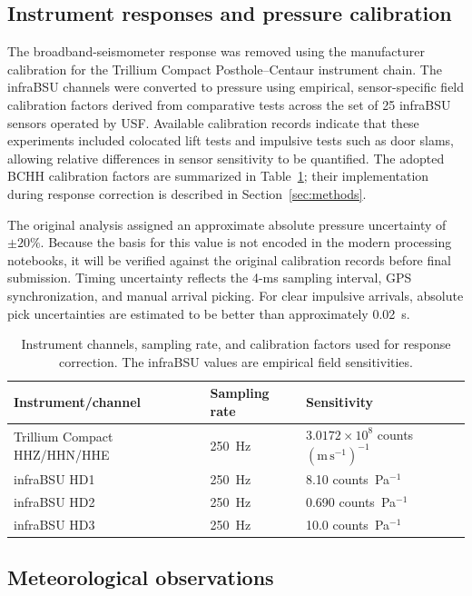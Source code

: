 \documentclass[]{seismica}
\begin{document}
\subsection{Instrument responses and pressure calibration}

The broadband-seismometer response was removed using the manufacturer
calibration for the Trillium Compact Posthole--Centaur instrument chain. The
infraBSU channels were converted to pressure using empirical, sensor-specific
field calibration factors derived from comparative tests across the set of 25
infraBSU sensors operated by USF. Available calibration records indicate that
these experiments included colocated lift tests and impulsive tests such as
door slams, allowing relative differences in sensor sensitivity to be
quantified. The adopted BCHH calibration factors are summarized in
Table~\ref{tab:instrument_calibration}; their implementation during response
correction is described in Section~\ref{sec:methods}.

The original analysis assigned an approximate absolute pressure uncertainty of
$\pm20\%$. Because the basis for this value is not encoded in the modern
processing notebooks, it will be verified against the original calibration
records before final submission. Timing uncertainty reflects the 4-ms sampling
interval, GPS synchronization, and manual arrival picking. For clear impulsive
arrivals, absolute pick uncertainties are estimated to be better than
approximately 0.02~s.

\begin{table}
\centering
\caption{Instrument channels, sampling rate, and calibration factors used for
response correction. The infraBSU values are empirical field sensitivities.}
\label{tab:instrument_calibration}
\begin{tabular}{lll}
\hline
Instrument/channel & Sampling rate & Sensitivity \\
\hline
Trillium Compact HHZ/HHN/HHE
  & 250~Hz
  & $3.0172\times10^8$ counts $(\mathrm{m\,s^{-1}})^{-1}$ \\
infraBSU HD1
  & 250~Hz
  & 8.10 counts~Pa$^{-1}$ \\
infraBSU HD2
  & 250~Hz
  & 0.690 counts~Pa$^{-1}$ \\
infraBSU HD3
  & 250~Hz
  & 10.0 counts~Pa$^{-1}$ \\
\hline
\end{tabular}
\end{table}


\subsection{Meteorological observations}
\end{document}
